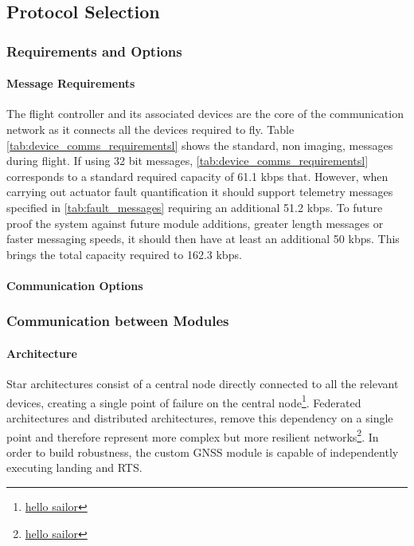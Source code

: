 \subsection{Protocol Selection}

\subsubsection{Requirements and Options}
\paragraph{Message Requirements}

The flight controller and its associated devices are the core of the communication network as it connects all the devices required to fly. Table \ref{tab:device_comms_requirementsl} shows the standard, non imaging, messages during flight. If using 32 bit messages, \ref{tab:device_comms_requirementsl} corresponds to a standard required capacity of 61.1 kbps that. However, when carrying out actuator fault quantification it should support telemetry messages specified in \ref{tab:fault_messages} requiring an additional 51.2 kbps. To future proof the system against future module additions, greater length messages or faster messaging speeds, it should then have at least an additional 50 kbps. This brings the total capacity required to 162.3 kbps.
\paragraph{Communication Options}


\subsubsection{Communication between Modules}
\paragraph{Architecture}
Star architectures consist of a central node directly connected to all the relevant devices, creating a single point of failure on the central node\footnote{\url{hello sailor}}. Federated architectures and distributed architectures, remove this dependency on a single point and therefore represent more complex but more resilient networks\footnote{\url{hello sailor}}. In order to build robustness, the custom \gls{GNSS} module is capable of independently executing landing and \gls{RTS}.  
